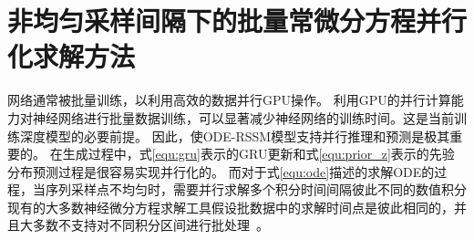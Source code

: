 \section{非均匀采样间隔下的批量常微分方程并行化求解方法}
\label{sec:5_parallel_ode_solve}
网络通常被批量训练，以利用高效的数据并行GPU操作。
利用GPU的并行计算能力对神经网络进行批量数据训练，可以显著减少神经网络的训练时间。这是当前训练深度模型的必要前提。
因此，使ODE-RSSM模型支持并行推理和预测是极其重要的。
在生成过程中，式\eqref{equ:gru}表示的GRU更新和式\eqref{equ:prior_z}表示的先验分布预测过程是很容易实现并行化的。
而对于式\eqref{equ:ode}描述的求解ODE的过程，当序列采样点不均匀时，需要并行求解多个积分时间间隔彼此不同的数值积分
现有的大多数神经微分方程求解工具假设批数据中的求解时间点是彼此相同的，并且大多数不支持对不同积分区间进行批处理~\cite{kidger2021}。
